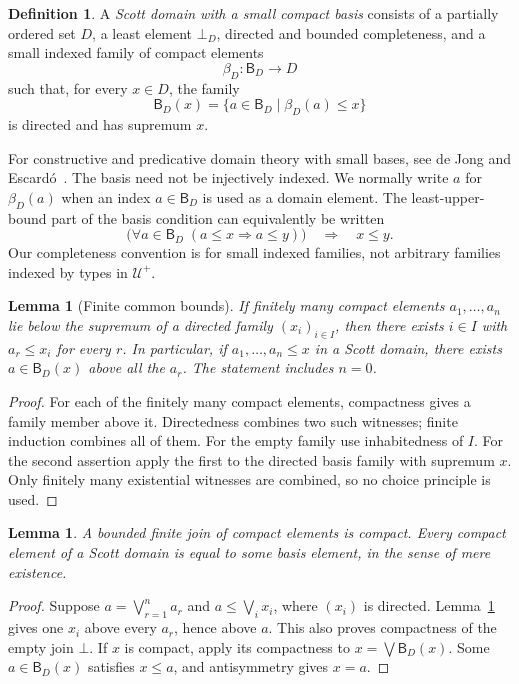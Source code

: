 \documentclass[11pt,a4paper]{article}
\newtheorem{lemma}[theorem]{Lemma}
\theoremstyle{definition}
\newtheorem{definition}[theorem]{Definition}
\theoremstyle{remark}
\newcommand{\UU}{\mathcal U}
\newcommand{\B}{\mathsf B}
\newcommand{\lub}{\bigvee}
\begin{document}
\begin{definition}\label{def:scott}
A \emph{Scott domain with a small compact basis} consists of a partially
ordered set $D$, a least element $\bot_D$, directed and bounded completeness,
and a small indexed family of compact elements
\[
 \beta_D:\B_D\longrightarrow D
\]
such that, for every $x\in D$, the family
\[
 \B_D(x)=\{a\in\B_D\mid\beta_D(a)\leq x\}
\]
is directed and has supremum $x$.
\end{definition}

For constructive and predicative domain theory with small bases, see
de Jong and Escard\'o~\cite{dejong-escardo}. The basis need not be
injectively indexed. We normally write $a$ for
$\beta_D(a)$ when an index $a\in\B_D$ is used as a domain element.
The least-upper-bound part of the basis condition can equivalently be
written
\begin{equation}\label{eq:density}
 \bigl(\forall a\in\B_D\;(a\leq x\Longrightarrow a\leq y)\bigr)
 \quad\Longrightarrow\quad x\leq y.
\end{equation}
Our completeness convention is for small indexed families, not arbitrary
families indexed by types in $\UU^+$.

\begin{lemma}[Finite common bounds]\label{lem:finite}
If finitely many compact elements $a_1,\ldots,a_n$ lie below the supremum
of a directed family $(x_i)_{i\in I}$, then there exists $i\in I$ with
$a_r\leq x_i$ for every $r$. In particular, if $a_1,\ldots,a_n\leq x$
in a Scott domain, there exists $a\in\B_D(x)$ above all the $a_r$.
The statement includes $n=0$.
\end{lemma}
\begin{proof}
For each of the finitely many compact elements, compactness gives a
family member above it. Directedness combines two such witnesses; finite
induction combines all of them. For the empty family use inhabitedness
of $I$. For the second assertion apply the first to the directed basis
family with supremum $x$. Only finitely many existential witnesses are
combined, so no choice principle is used.
\end{proof}

\begin{lemma}\label{lem:compactjoins}
A bounded finite join of compact elements is compact. Every compact
element of a Scott domain is equal to some basis element, in the sense
of mere existence.
\end{lemma}
\begin{proof}
Suppose $a=\lub_{r=1}^n a_r$ and $a\leq\lub_i x_i$, where $(x_i)$ is
directed. Lemma~\ref{lem:finite} gives one $x_i$ above every $a_r$, hence
above $a$. This also proves compactness of the empty join $\bot$.
If $x$ is compact, apply its compactness to
$x=\lub\B_D(x)$. Some $a\in\B_D(x)$ satisfies $x\leq a$, and
antisymmetry gives $x=a$.
\end{proof}
\end{document}
